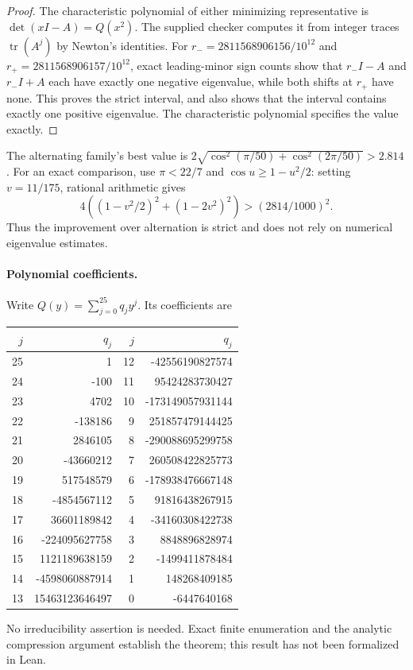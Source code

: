 \begin{proof}
The characteristic polynomial of either minimizing representative is
$\det(xI-A)=Q(x^2)$. The supplied checker computes it from integer traces
$\operatorname{tr}(A^j)$ by Newton's identities. For
$r_-=2811568906156/10^{12}$ and
$r_+=2811568906157/10^{12}$, exact leading-minor sign counts show
that $r_-I-A$ and $r_-I+A$ each have exactly one negative eigenvalue,
while both shifts at $r_+$ have none. This proves the strict interval,
and also shows that the interval contains exactly one positive
eigenvalue. The characteristic polynomial specifies the value exactly.
\end{proof}

The alternating family's best value is
$2\sqrt{\cos^2(\pi/50)+\cos^2(2\pi/50)}>2.814$.
For an exact comparison, use $\pi<22/7$ and
$\cos u\ge1-u^2/2$: setting $v=11/175$, rational arithmetic gives
\[
 4\left((1-v^2/2)^2+(1-2v^2)^2\right)>(2814/1000)^2.
\]
Thus the improvement over alternation is strict and does not rely on
numerical eigenvalue estimates.

\paragraph{Polynomial coefficients.}
Write $Q(y)=\sum_{j=0}^{25}q_jy^j$. Its coefficients are
\begin{center}\small
\begin{tabular}{rr@{\qquad}rr}
\hline
$j$&$q_j$&$j$&$q_j$\\\hline
25&1&12&-42556190827574\\
24&-100&11&95424283730427\\
23&4702&10&-173149057931144\\
22&-138186&9&251857479144425\\
21&2846105&8&-290088695299758\\
20&-43660212&7&260508422825773\\
19&517548579&6&-178938476667148\\
18&-4854567112&5&91816438267915\\
17&36601189842&4&-34160308422738\\
16&-224095627758&3&8848896828974\\
15&1121189638159&2&-1499411878484\\
14&-4598060887914&1&148268409185\\
13&15463123646497&0&-6447640168\\\hline
\end{tabular}
\end{center}
No irreducibility assertion is needed. Exact finite enumeration and
the analytic compression argument establish the theorem; this result
has not been formalized in Lean.
